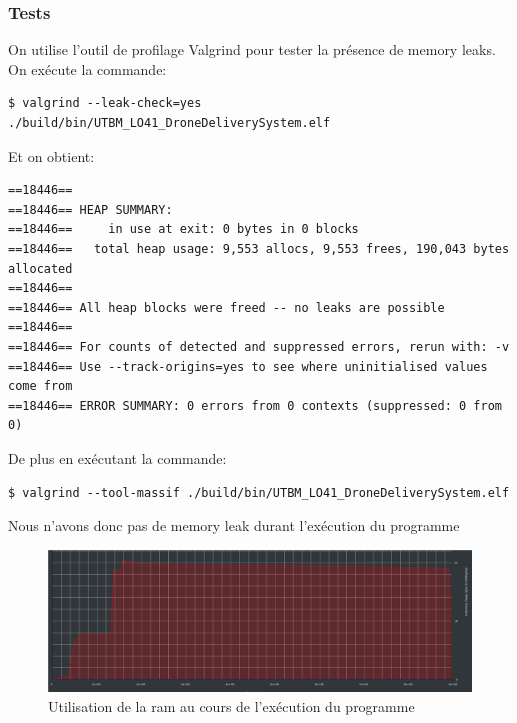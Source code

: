 \documentclass[article, backcover, french, nodocumentinfo]{upmethodology-document}
\begin{document}
			\subsubsection{Tests}
				On utilise l’outil de profilage Valgrind pour tester la présence de memory leaks.\\
				On exécute la commande:
				\begin{lstlisting}[breaklines=true,breakatwhitespace=true,breakindent=0pt,columns=fixed,keepspaces=true,frame=single,basicstyle=\footnotesize\sffamily]
$ valgrind --leak-check=yes ./build/bin/UTBM_LO41_DroneDeliverySystem.elf\end{lstlisting}
				Et on obtient:
				\begin{lstlisting}[breaklines=true,breakatwhitespace=true,breakindent=0pt,columns=fixed,keepspaces=true,frame=single,basicstyle=\footnotesize\sffamily]
==18446==
==18446== HEAP SUMMARY:
==18446==     in use at exit: 0 bytes in 0 blocks
==18446==   total heap usage: 9,553 allocs, 9,553 frees, 190,043 bytes allocated
==18446==
==18446== All heap blocks were freed -- no leaks are possible
==18446==
==18446== For counts of detected and suppressed errors, rerun with: -v
==18446== Use --track-origins=yes to see where uninitialised values come from
==18446== ERROR SUMMARY: 0 errors from 0 contexts (suppressed: 0 from 0)\end{lstlisting}
				De plus en exécutant la commande:
				\begin{lstlisting}[breaklines=true,breakatwhitespace=true,breakindent=0pt,columns=fixed,keepspaces=true,frame=single,basicstyle=\footnotesize\sffamily]
$ valgrind --tool-massif ./build/bin/UTBM_LO41_DroneDeliverySystem.elf \end{lstlisting}

				Nous n'avons donc pas de memory leak durant l'exécution du programme
				\begin{figure}[H]
					\centering
					\includegraphics[width=\textwidth]{figures/memory}
					\caption{Utilisation de la ram au cours de l'exécution du programme}
					\label{fig:MemoryUsage}
				\end{figure}
\end{document}
